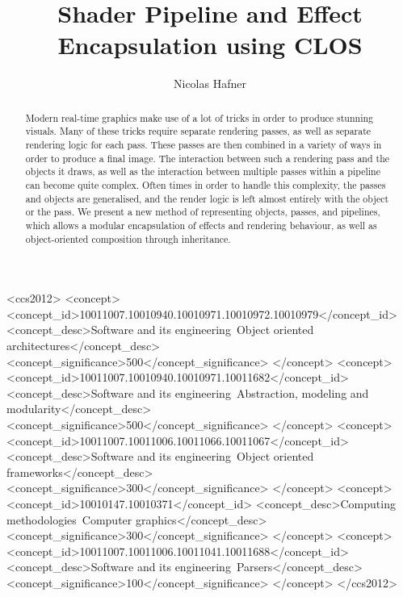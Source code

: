 \documentclass[format=sigconf]{acmart}
\begin{document}
\title{Shader Pipeline and Effect Encapsulation using CLOS}

\author{Nicolas Hafner}

\begin{abstract}
  Modern real-time graphics make use of a lot of tricks in order to produce stunning visuals. Many of these tricks require separate rendering passes, as well as separate rendering logic for each pass. These passes are then combined in a variety of ways in order to produce a final image. The interaction between such a rendering pass and the objects it draws, as well as the interaction between multiple passes within a pipeline can become quite complex. Often times in order to handle this complexity, the passes and objects are generalised, and the render logic is left almost entirely with the object or the pass. We present a new method of representing objects, passes, and pipelines, which allows a modular encapsulation of effects and rendering behaviour, as well as object-oriented composition through inheritance.
\end{abstract}

\begin{CCSXML}
  <ccs2012>
  <concept>
  <concept_id>10011007.10010940.10010971.10010972.10010979</concept_id>
  <concept_desc>Software and its engineering~Object oriented architectures</concept_desc>
  <concept_significance>500</concept_significance>
  </concept>
  <concept>
  <concept_id>10011007.10010940.10010971.10011682</concept_id>
  <concept_desc>Software and its engineering~Abstraction, modeling and modularity</concept_desc>
  <concept_significance>500</concept_significance>
  </concept>
  <concept>
  <concept_id>10011007.10011006.10011066.10011067</concept_id>
  <concept_desc>Software and its engineering~Object oriented frameworks</concept_desc>
  <concept_significance>300</concept_significance>
  </concept>
  <concept>
  <concept_id>10010147.10010371</concept_id>
  <concept_desc>Computing methodologies~Computer graphics</concept_desc>
  <concept_significance>300</concept_significance>
  </concept>
  <concept>
  <concept_id>10011007.10011006.10011041.10011688</concept_id>
  <concept_desc>Software and its engineering~Parsers</concept_desc>
  <concept_significance>100</concept_significance>
  </concept>
  </ccs2012>
\end{CCSXML}

\end{document}

